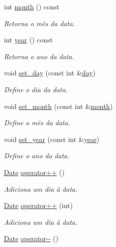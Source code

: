 \begin{DoxyCompactItemize}
int \hyperlink{classDate_a82f550e37c8ff6a3709a256b2e43b762}{month} () const
\begin{DoxyCompactList}\small\item\em Retorna o mês da data. \end{DoxyCompactList}\item 
int \hyperlink{classDate_adb59de8d1ac3b04cbd57be3b551be2dc}{year} () const
\begin{DoxyCompactList}\small\item\em Retorna o ano da data. \end{DoxyCompactList}\item 
void \hyperlink{classDate_a7bd9d8f2f53cb54c151aff444fd3b4a6}{set\+\_\+day} (const int \&\hyperlink{classDate_a42aff770b2b450b6b2d83789b9194d56}{day})
\begin{DoxyCompactList}\small\item\em Define o dia da data. \end{DoxyCompactList}\item 
void \hyperlink{classDate_ab264919c7dfd3ea017fb5dc08af64796}{set\+\_\+month} (const int \&\hyperlink{classDate_a82f550e37c8ff6a3709a256b2e43b762}{month})
\begin{DoxyCompactList}\small\item\em Define o mês da data. \end{DoxyCompactList}\item 
void \hyperlink{classDate_a275c629c60d6f8d29440b1a89273b091}{set\+\_\+year} (const int \&\hyperlink{classDate_adb59de8d1ac3b04cbd57be3b551be2dc}{year})
\begin{DoxyCompactList}\small\item\em Define o ano da data. \end{DoxyCompactList}\item 
\hyperlink{classDate}{Date} \hyperlink{classDate_a0c5386da90c6834a3e7a110b02e2abaa}{operator++} ()
\begin{DoxyCompactList}\small\item\em Adiciona um dia à data. \end{DoxyCompactList}\item 
\hyperlink{classDate}{Date} \hyperlink{classDate_a63f7060a7a7997e289e5e885f84557e5}{operator++} (int)
\begin{DoxyCompactList}\small\item\em Adiciona um dia à data. \end{DoxyCompactList}\item 
\hyperlink{classDate}{Date} \hyperlink{classDate_ae7b4f70781bb5775538fddb5f5d8e143}{operator-\/-\/} ()

\end{DoxyCompactItemize}
